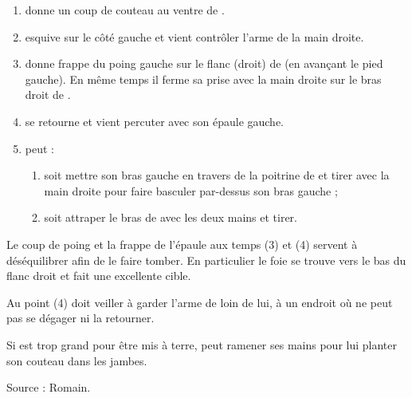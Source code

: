 \begin{technique}

\begin{enumerate}
	\item \A donne un coup de couteau au ventre de \D.
	
	\item \D esquive sur le côté gauche et vient contrôler l'arme de la main droite.
	
	\item \D donne frappe du poing gauche sur le flanc (droit) de \A (en avançant le pied gauche).
	En même temps il ferme sa prise avec la main droite sur le bras droit de \A.
	
	\item \D se retourne et vient percuter \A avec son épaule gauche.
	
	\item \D peut :
	\begin{enumerate}
		\item soit mettre son bras gauche en travers de la poitrine de \A et tirer avec la main droite pour faire basculer \A par-dessus son bras gauche ;
		
		\item soit attraper le bras de \A avec les deux mains et tirer.
	\end{enumerate}

\end{enumerate}

Le coup de poing et la frappe de l'épaule aux temps (3) et (4) servent à déséquilibrer \A afin de le faire tomber.
En particulier le foie se trouve vers le bas du flanc droit et fait une excellente cible.

Au point (4) \D doit veiller à garder l'arme de \A loin de lui, à un endroit où \A ne peut pas se dégager ni la retourner.

Si \A est trop grand pour être mis à terre, \D peut ramener ses mains pour lui planter son couteau dans les jambes.

Source : Romain.

\end{technique}

